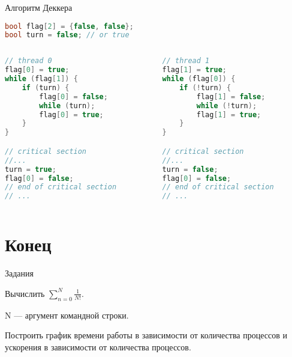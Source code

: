 \begin{frame}[fragile]{Алгоритм Деккера}

\begin{lstlisting}[language=C++,basicstyle=\ttfamily,keywordstyle=\color{blue},basicstyle=\scriptsize]
bool flag[2] = {false, false};
bool turn = false; // or true
\end{lstlisting}

\begin{columns}[t]
    \begin{column}[T]{0.45\textwidth}
        \begin{lstlisting}[language=C++,basicstyle=\ttfamily,keywordstyle=\color{blue},basicstyle=\scriptsize]
// thread 0
flag[0] = true;
while (flag[1]) {
    if (turn) {
        flag[0] = false;
        while (turn);
        flag[0] = true;
    }
}

// critical section
//...
turn = true;
flag[0] = false;
// end of critical section
// ...
        \end{lstlisting}
    \end{column}
    \begin{column}[T]{0.45\textwidth}
        \begin{lstlisting}[language=C++,basicstyle=\ttfamily,keywordstyle=\color{blue},basicstyle=\scriptsize]
// thread 1
flag[1] = true;
while (flag[0]) {
    if (!turn) {
        flag[1] = false;
        while (!turn);
        flag[1] = true;
    }
}

// critical section
//...
turn = false;
flag[0] = false;
// end of critical section
// ...
        \end{lstlisting}
    \end{column}
\end{columns}

\end{frame}

\section{Конец}

\begin{frame}{Задания}

Вычислить $\sum \limits_{n=0}^{N} \frac{1}{N!}$.

N --- аргумент командной строки.

Построить график времени работы в зависимости от количества процессов и ускорения в зависимости от количества процессов.

\end{frame}

